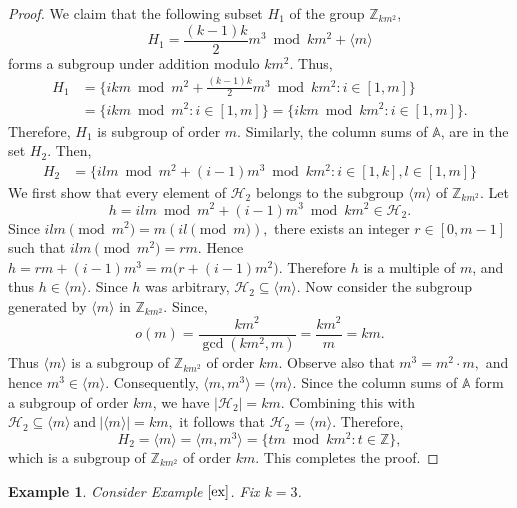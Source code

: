 \documentclass[preprint,11pt]{elsarticle}
\newtheorem{example}[theorem]{Example}
\begin{document}
\begin{proof}
\noindent We claim that the following subset $H_1$ of the group $\mathbb{Z}_{k m^2}$,
\[
H_1 = \frac{(k-1
)k}{2}m^3 \bmod{km^2}+  \langle m \rangle   
\]
forms a subgroup under addition modulo $k m^2$.
Thus, \begin{align*}
    H_1 & = \{ikm\bmod{m^2}+ \frac{(k-1)k}{2}m^3\bmod{km^2}: i \in [1, m]\}\\
    & = \{ikm\bmod{m^2}:  i \in [1, m]\} = \{ikm\bmod{km^2}:  i \in [1, m]\}.
\end{align*}
\noindent Therefore, $H_1$ is  subgroup of order $m$. Similarly, the column sums of $\mathbb{A}$, are in the set $H_2$. Then, \begin{align*}
    H_2&= \{ilm\bmod{m^2}+(i-1)m^3\bmod{km^2} : i \in[1,k], l \in[1,m]\}
\end{align*} 
We first show that every element of \(\mathcal H_2\) belongs to the subgroup
\(\langle m\rangle\) of \(\mathbb Z_{km^2}\). Let
\[
h=ilm \bmod{m^2}+(i-1)m^3 \bmod{km^2}
\in \mathcal H_2.
\]
Since
\(
ilm \pmod{m^2}=m(il \pmod m),
\)
there exists an integer \(r\in[0,m-1]\) such that
\(
ilm \pmod{m^2}=rm.
\)
Hence
\(
h=rm+(i-1)m^3=m\bigl(r+(i-1)m^2\bigr).
\)
Therefore \(h\) is a multiple of \(m\), and thus
\(
h\in \langle m\rangle.
\)
Since \(h\) was arbitrary,
\(
\mathcal H_2\subseteq \langle m\rangle\). Now consider the subgroup generated by $\langle m\rangle$ in $\mathbb{Z}_{km^2}$. Since,
\[ o(m)=\frac{km^2}{\gcd(km^2,m)}=
\frac{km^2}{m}=
km.
\]
Thus \(\langle m\rangle\) is a subgroup of \(\mathbb Z_{km^2}\) of order \(km\). Observe also that
\(
m^3=m^2\cdot m,
\)
and hence
\(
m^3\in\langle m\rangle.
\)
Consequently,
\(
\langle m,m^3\rangle=\langle m\rangle.
\) Since the column sums of \(\mathbb A\) form a subgroup of order \(km\), we have
\(
|\mathcal H_2|=km.
\)
Combining this with
\(
\mathcal H_2\subseteq \langle m\rangle
~\text{and}~
|\langle m\rangle|=km,
\)
it follows that
\(
\mathcal H_2=\langle m\rangle.
\)
Therefore, 
\[H_2=\langle m\rangle=
\langle m,m^3\rangle=
\{tm \bmod{km^2}: t\in\mathbb Z\},
\]
\noindent which is a subgroup of \(\mathbb Z_{km^2}\) of order \(km\). This completes the proof.\end{proof}
\begin{example}
    Consider Example \(\ref{ex}\). Fix $k=3$. 
\end{example}
\end{document}
